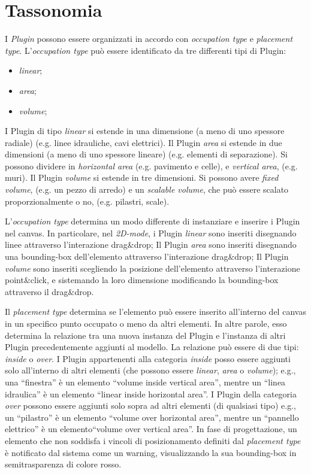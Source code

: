 \section{Tassonomia}
\label{sec:chapter_3_section_2}

\noindent
I \emph{Plugin} possono essere organizzati in accordo con \emph{occupation type} e \emph{placement type}.
L'\emph{occupation type} può essere identificato da tre differenti tipi di Plugin:
\begin{itemize}
  \item \emph{linear};
  \item \emph{area};
  \item \emph{volume};
\end{itemize}
I Plugin di tipo \emph{linear} si estende in una dimensione (a meno di uno spessore radiale) (e.g. linee idrauliche, cavi elettrici).
Il Plugin \emph{area} si estende in due dimensioni (a meno di uno spessore lineare) (e.g. elementi di separazione).
Si possono dividere in \emph{horizontal area} (e.g. pavimento e celle), e \emph{vertical area}, (e.g. muri).
Il Plugin \emph{volume} si estende in tre dimensioni. Si possono avere \emph{fixed volume}, (e.g. un pezzo di arredo) e
un \emph{scalable volume}, che può essere scalato proporzionalmente o no, (e.g. pilastri, scale).


L'\emph{occupation type} determina un modo differente di instanziare e inserire i Plugin nel canvas.
In particolare, nel \emph{2D-mode}, i Plugin \emph{linear} sono inseriti disegnando linee attraverso l'interazione drag\&drop;
Il Plugin \emph{area} sono inseriti disegnando una bounding-box dell'elemento attraverso l'interazione drag\&drop;
Il Plugin \emph{volume} sono inseriti scegliendo la posizione dell'elemento attraverso l'interazione point\&click,
e sistemando la loro dimensione modificando la bounding-box attraverso il drag\&drop.


Il \emph{placement type} determina se l'elemento può essere inserito all'interno del canvas in un specifico punto occupato o meno
da altri elementi. In altre parole, esso determina la relazione tra una nuova instanza del Plugin e l'instanza di altri
Plugin precedentemente aggiunti al modello. La relazione può essere di due tipi: \emph{inside} o \emph{over}.
I Plugin appartenenti alla categoria \emph{inside} posso essere aggiunti solo all'interno di altri elementi (che possono essere
\emph{linear}, \emph{area} o \emph{volume}); e.g., una ``finestra'' è un elemento ``volume inside vertical area'',
mentre un ``linea idraulica'' \`e un elemento ``linear inside horizontal area''.
I Plugin della categoria \emph{over} possono essere aggiunti solo sopra ad altri elementi (di qualsiasi tipo)
e.g., un ``pilastro'' \`e un elemento ``volume over horizontal area'',
mentre un ``pannello elettrico'' è un elemento``volume over vertical area''.
In fase di progettazione, un elemento che non soddisfa i vincoli di posizionamento definiti dal \emph{placement type} \`e
notificato dal sistema come un warning, visualizzando la sua bounding-box in semitrasparenza di colore rosso.
\newpage
